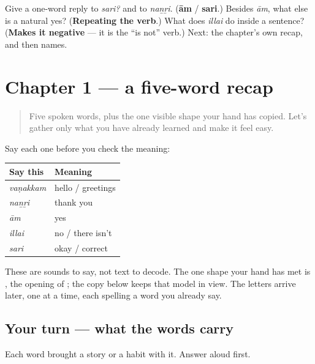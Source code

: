 \begin{tcolorbox}[breakable,colback=teal!4,colframe=teal!35!black,title={Before you move on}]
Give a one-word reply to \emph{sari?} and to \emph{naṉṟi}. (\textbf{ām} / \textbf{sari}.) Besides \emph{ām}, what else is a natural yes? (\textbf{Repeating the verb}.) What does \emph{illai} do inside a sentence? (\textbf{Makes it negative} — it is the \textquotedblleft{}is not\textquotedblright{} verb.) Next: the chapter's own recap, and then names.
\end{tcolorbox}
\section[Practice]{Chapter 1 — a five-word recap}

\label{lesson:TA-C01-practice}



\begin{quote}
Five spoken words, plus the one visible shape your hand has copied. Let's gather only what you have already learned and make it feel easy.
\end{quote}

\begin{grammarlens}[title={What you've built — say them back}]
Say each one before you check the meaning:

\noindent
\begin{tabularx}{\linewidth}{@{}>{\raggedright\arraybackslash}X>{\raggedright\arraybackslash}X@{}}
\toprule
\textbf{Say this} & \textbf{Meaning} \\
\midrule
\emph{vaṇakkam} & hello / greetings \\
\emph{naṉṟi} & thank you \\
\emph{ām} & yes \\
\emph{illai} & no / there isn't \\
\emph{sari} & okay / correct \\
\bottomrule
\end{tabularx}

These are sounds to say, not text to decode. The one shape your hand has met is \textbf{}, the opening of \textbf{}; the copy below keeps that model in view. The letters arrive later, one at a time, each spelling a word you already say.
\end{grammarlens}

\subsection*{Your turn — what the words carry}
Each word brought a story or a habit with it. Answer aloud first.

